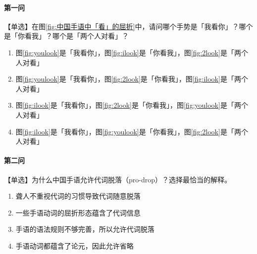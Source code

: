 \documentclass[12pt, a4paper, oneside]{ctexart}
\begin{document}
\paragraph{第一问}
【单选】在图\ref{fig:中国手语中「看」的屈折}中，请问哪个手势是「我看你」？哪个是「你看我」？哪个是「两个人对看」？
\begin{enumerate}[label=\Alph*.]
    \item 图\ref{fig:youlook}是「我看你」，图\ref{fig:ilook}是「你看我」，图\ref{fig:2look}是「两个人对看」
    \item 图\ref{fig:youlook}是「我看你」，图\ref{fig:2look}是「你看我」，图\ref{fig:ilook}是「两个人对看」
    \item 图\ref{fig:ilook}是「我看你」，图\ref{fig:2look}是「你看我」，图\ref{fig:youlook}是「两个人对看」
    \item 图\ref{fig:ilook}是「我看你」，图\ref{fig:youlook}是「你看我」，图\ref{fig:2look}是「两个人对看」
\end{enumerate}

\paragraph{第二问}
【单选】为什么中国手语允许代词脱落（pro-drop）？选择最恰当的解释。
\begin{enumerate}[label=\Alph*.]
    \item 聋人不重视代词的习惯导致代词随意脱落
    \item 一些手语动词的屈折形态蕴含了代词信息
    \item 手语的语法规则不够完善，所以允许代词脱落
    \item 手语动词都蕴含了论元，因此允许省略
\end{enumerate}
\end{document}

